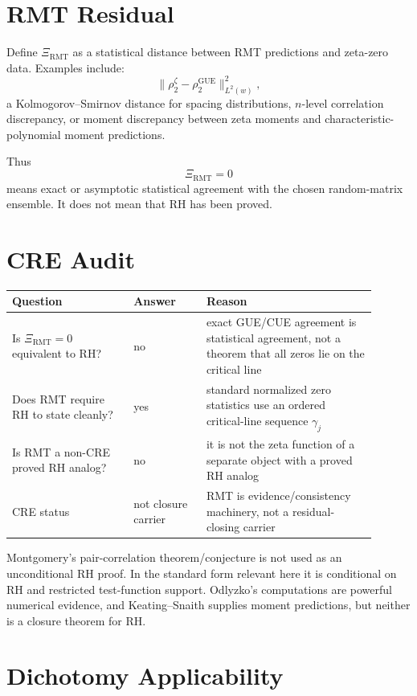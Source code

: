 \documentclass[11pt]{article}
\newcommand{\XiRMT}{\Xi_{\mathrm{RMT}}}
\begin{document}
\section*{RMT Residual}

Define \(\XiRMT\) as a statistical distance between RMT predictions and
zeta-zero data.  Examples include:
\[
\|\rho^{\zeta}_2-\rho^{\mathrm{GUE}}_2\|_{L^2(w)}^2,
\]
a Kolmogorov--Smirnov distance for spacing distributions, \(n\)-level
correlation discrepancy, or moment discrepancy between zeta moments and
characteristic-polynomial moment predictions.

Thus
\[
\XiRMT=0
\]
means exact or asymptotic statistical agreement with the chosen random-matrix
ensemble.  It does not mean that RH has been proved.

\section*{CRE Audit}

\begin{center}
\begin{tabular}{p{0.30\linewidth}p{0.18\linewidth}p{0.42\linewidth}}
\toprule
Question & Answer & Reason\\
\midrule
Is \(\XiRMT=0\) equivalent to RH? & no
& exact GUE/CUE agreement is statistical agreement, not a theorem that all
zeros lie on the critical line\\
Does RMT require RH to state cleanly? & yes
& standard normalized zero statistics use an ordered critical-line sequence
\(\gamma_j\)\\
Is RMT a non-CRE proved RH analog? & no
& it is not the zeta function of a separate object with a proved RH analog\\
CRE status & not closure carrier
& RMT is evidence/consistency machinery, not a residual-closing carrier\\
\bottomrule
\end{tabular}
\end{center}

Montgomery's pair-correlation theorem/conjecture is not used as an
unconditional RH proof.  In the standard form relevant here it is conditional
on RH and restricted test-function support.  Odlyzko's computations are
powerful numerical evidence, and Keating--Snaith supplies moment predictions,
but neither is a closure theorem for RH.

\section*{Dichotomy Applicability}
\end{document}
